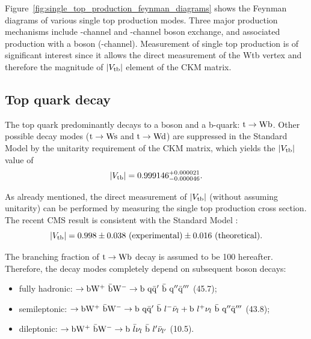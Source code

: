 

Figure~\ref{fig:single_top_production_feynman_diagrams} shows the Feynman diagrams of various single top production
modes. Three major production mechanisms include \cPqs-channel and \cPqt-channel \W boson exchange, and associated
production with a \W boson (\tW-channel). Measurement of single top production is of significant interest since it
allows the direct measurement of the Wtb vertex and therefore the magnitude of $|V_{\mathrm{t}\mathrm{b}}|$ element of the CKM matrix.



\subsection{Top quark decay}
\label{ss:top_decay}
The top quark predominantly decays to a \W boson and a b-quark: $\mathrm{t} \rightarrow \mathrm{W} \mathrm{b}$. Other possible decay modes
($\mathrm{t} \rightarrow \mathrm{W} \mathrm{s}$ and $\mathrm{t} \rightarrow \mathrm{W} \mathrm{d}$) are suppressed in the Standard Model by the unitarity
requirement of the CKM matrix, which yields \autocite{PDG} the $|V_{\mathrm{t}\mathrm{b}}|$ value of
\begin{equation}
|V_{\mathrm{t}\mathrm{b}}| = 0.999146^{+0.000021}_{-0.000046}.
\end{equation}

As already mentioned, the direct measurement of $|V_{\mathrm{t}\mathrm{b}}|$ (without assuming unitarity) can be performed by measuring
the single top production cross section. The recent CMS result is consistent with the Standard Model
\autocite{single_top_Vtb_CMS}:
\begin{equation}
|V_{\mathrm{t}\mathrm{b}}| = 0.998 \pm 0.038~\textrm{(experimental)} \pm 0.016~\textrm{(theoretical)}.
\end{equation}

The branching fraction of $\mathrm{t} \rightarrow \mathrm{W} \mathrm{b}$ decay is assumed to be \SI{100}{\pc} hereafter. Therefore, the
\ttbar decay modes completely depend on subsequent \W boson decays:
\begin{itemize}
  \item fully hadronic: \ttbar $\rightarrow \mathrm{b} \mathrm{W}^+ ~ \bar{\mathrm{b}} \mathrm{W}^- \rightarrow  \mathrm{b}~\mathrm{q}\bar{\mathrm{q}}' ~
  \bar{\mathrm{b}}~\mathrm{q}'' \bar{\mathrm{q}}'''$ (\SI{45.7}{\pc});
  \item semileptonic: \ttbar $\rightarrow \mathrm{b} \mathrm{W}^+ ~ \bar{\mathrm{b}} \mathrm{W}^- \rightarrow \mathrm{b}~\mathrm{q}\bar{\mathrm{q}}' ~ \bar{\mathrm{b}}
  ~ l^- \bar{\nu}_l + \mathrm{b}~l^+ \nu_l ~ \bar{\mathrm{b}}~\mathrm{q}'' \bar{\mathrm{q}}'''$ (\SI{43.8}{\pc});
  \item dileptonic: \ttbar $\rightarrow \mathrm{b} \mathrm{W}^+ ~ \bar{\mathrm{b}} \mathrm{W}^- \rightarrow  \mathrm{b}~\bar{l} \nu_l ~ \bar{\mathrm{b}} ~
  l'\bar{\nu}_{l'}$ (\SI{10.5}{\pc}).
\end{itemize}

